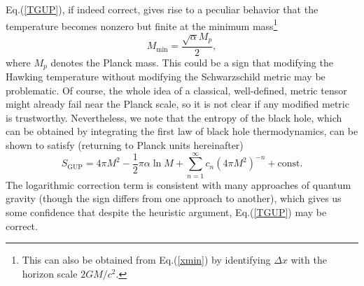 \documentclass[preprintnumbers, floatfix, preprintnumbers, letterpaper, twocolumn, superscriptaddress,nofootinbib]{revtex4-2}
\begin{document}
Eq.(\ref{TGUP}), if indeed correct, gives rise to a peculiar behavior that the temperature becomes nonzero but finite at the minimum mass\footnote{This can also be obtained from Eq.(\ref{xmin}) by identifying $\Delta x$ with the horizon scale $2GM/c^2$.} 
\begin{equation}\label{Mmin}
M_\text{min}=\frac{\sqrt{\alpha}M_p}{2}, 
\end{equation}
where $M_p$ denotes the Planck mass. This could be a sign that modifying the Hawking temperature without modifying the Schwarzschild metric may be problematic. Of course, the whole idea of a classical, well-defined, metric tensor might already fail near the Planck scale, so it is not clear if any modified metric is trustworthy. Nevertheless, we note that the entropy of the black hole, which can be obtained by integrating the first law of black hole thermodynamics, can be shown to satisfy (returning to Planck units hereinafter)
\begin{equation}\label{SGUP}
S_\text{GUP} = 4\pi M^2 - \frac{1}{2}\pi \alpha \ln M + \sum_{n=1}^\infty c_n (4\pi M^2)^{-n} + \text{const.}
\end{equation}
The logarithmic correction term is consistent with many approaches of quantum gravity (though the sign differs from one approach to another), which gives us some confidence that despite the heuristic argument, Eq.(\ref{TGUP}) may be correct.
\end{document}
